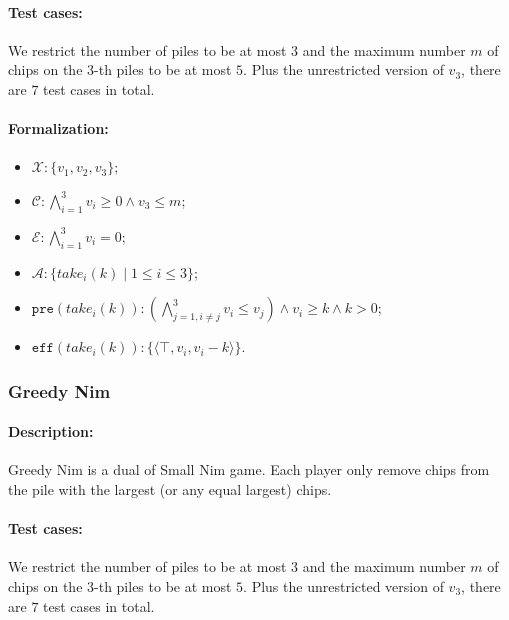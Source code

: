 \documentclass[review]{elsarticle}
\newcommand{\set}[1]{\{ #1 \}}
\newcommand{\tuple}[1]{\langle {#1} \rangle}
\newcommand{\true}{\top}
\newcommand{\statevar}{\mathcal{X}}
\newcommand{\act}{\mathcal{A}}
\newcommand{\constraint}{\mathcal{C}}
\newcommand{\estate}{\mathcal{E}}
\newcommand{\pre}{\mathtt{pre}}
\newcommand{\eff}{\mathtt{eff}}
\begin{document}
\paragraph{Test cases:}
We restrict the number of piles to be at most $3$ and the maximum number $m$ of chips on the $3$-th piles to be at most $5$. 
Plus the unrestricted version of $v_3$, there are $7$ test cases in total.

\paragraph{Formalization:}

\begin{itemize}
	\item $\statevar: \set{v_1, v_2, v_3}$;
	\item $\constraint:\bigwedge_{i=1}^{3} v_i \ge 0 \wedge v_3 \le m$;
	\item $\estate: \bigwedge_{i=1}^{3} v_i = 0$;
	\item $\act:\set{take_i(k) {\mid}1\le i \le 3}$;
	\item $\pre(take_i(k)) : (\bigwedge_{j=1,i\neq j}^{3} v_i \le v_j) \wedge v_i \ge k \wedge  k > 0$;
	\item $\eff(take_i(k)) : \set{\tuple{\true, v_i, v_i-k}}$.
\end{itemize}



\subsubsection{Greedy Nim \protect\cite{AlbN2004}}

\paragraph{Description:}
Greedy Nim is a dual of Small Nim game.
Each player only remove chips from the pile with the largest (or any equal largest) chips.

\paragraph{Test cases:}
We restrict the number of piles to be at most $3$ and the maximum number $m$ of chips on the $3$-th piles to be at most $5$. 
Plus the unrestricted version of $v_3$, there are $7$ test cases in total.
\end{document}
